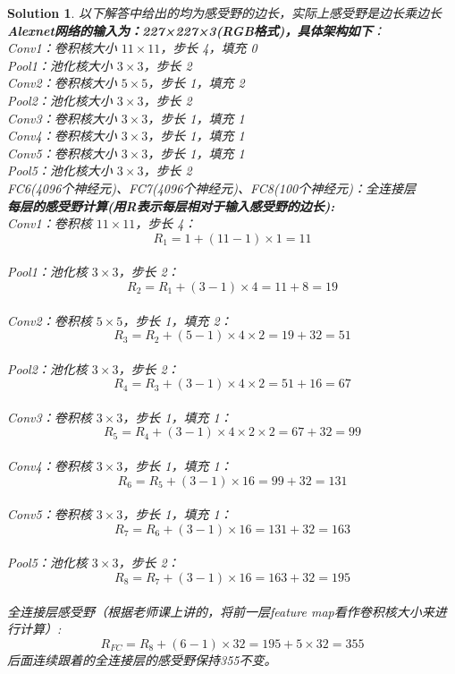 \documentclass{article}
\theoremstyle{Problem}
\theoremstyle{Solution}
\newtheorem*{sol}{Solution}
\begin{document}
	\begin{sol}
	{\color{red} 以下解答中给出的均为感受野的边长，实际上感受野是边长乘边长}\\
	\textbf{Alexnet网络的输入为：227×227×3(RGB格式)，具体架构如下}：\\
	Conv1：卷积核大小 \( 11 \times 11 \)，步长 4，填充 0\\
	Pool1：池化核大小 \( 3 \times 3 \)，步长 2\\
	Conv2：卷积核大小 \( 5 \times 5 \)，步长 1，填充 2\\
	Pool2：池化核大小 \( 3 \times 3 \)，步长 2\\
	Conv3：卷积核大小 \( 3 \times 3 \)，步长 1，填充 1\\
	Conv4：卷积核大小 \( 3 \times 3 \)，步长 1，填充 1\\
	Conv5：卷积核大小 \( 3 \times 3 \)，步长 1，填充 1\\
	Pool5：池化核大小 \( 3 \times 3 \)，步长 2\\
	FC6(4096个神经元)、FC7(4096个神经元)、FC8(100个神经元)：全连接层\\
	
	\textbf{每层的感受野计算(用R表示每层相对于输入感受野的边长):}\\
	Conv1：卷积核 \( 11 \times 11 \)，步长 4：
	\[
	R_1 = 1 + (11 - 1) \times 1 = 11
	\]\\
	Pool1：池化核 \( 3 \times 3 \)，步长 2：
	\[
	R_2 = R_1 + (3 - 1) \times 4= 11 + 8 = 19
	\]\\
	Conv2：卷积核 \( 5 \times 5 \)，步长 1，填充 2：
	\[
	R_3 = R_2 + (5 - 1) \times 4 \times 2 = 19 + 32 = 51
	\]\\
	Pool2：池化核 \( 3 \times 3 \)，步长 2：
	\[
	R_4 = R_3 + (3 - 1) \times 4 \times 2 = 51 + 16 = 67
	\]\\
	Conv3：卷积核 \( 3 \times 3 \)，步长 1，填充 1：
	\[
	R_5 = R_4 + (3 - 1) \times 4 \times 2 \times 2 = 67 + 32 = 99
	\]\\
	Conv4：卷积核 \( 3 \times 3 \)，步长 1，填充 1：
	\[
	R_6 = R_5 + (3 - 1) \times 16 = 99 + 32 = 131
	\]\\
	Conv5：卷积核 \( 3 \times 3 \)，步长 1，填充 1：
	\[
	R_7 = R_6 + (3 - 1) \times 16 = 131 + 32 = 163
	\]\\
	Pool5：池化核 \( 3 \times 3 \)，步长 2：
	\[
	R_8 = R_7 + (3 - 1) \times 16 = 163 + 32 = 195
	\]\\
	全连接层感受野（根据老师课上讲的，将前一层feature map看作卷积核大小来进行计算）:
	\[
	R_{FC} = R_8 + (6 - 1) \times 32 = 195 + 5\times32 = 355
	\]
	后面连续跟着的全连接层的感受野保持355不变。
	
	\end{sol}
\end{document}
